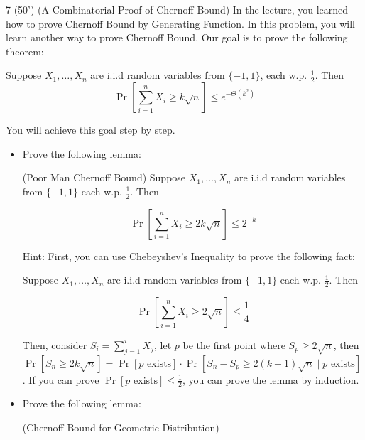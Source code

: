     
    \begin{question}{7 (50') (A Combinatorial Proof of Chernoff Bound)} 
    In the lecture, you learned how to prove Chernoff Bound by Generating Function.  In this problem, you will learn another way to prove Chernoff Bound. Our goal is to prove the following theorem: 

    \begin{theorem}\label{main}
    Suppose $X_1, \dots, X_n$ are i.i.d random variables from $\{-1, 1\}$, each w.p. $\frac 12$. Then $$\Pr[\sum_{i = 1} ^ n X_i \ge k \sqrt n] \le e ^ {- \Theta(k ^ 2)}$$
    \end{theorem}

    You will achieve this goal step by step. 

    
    
    \begin{itemize}
        \item[a. (10')] Prove the following lemma: 
        
        \begin{lemma} (Poor Man Chernoff Bound)
            Suppose $X_1, \dots, X_n$ are i.i.d random variables from $\{-1, 1\}$ each w.p. $\frac 12$. Then 
            
            $$\Pr[\sum_{i = 1} ^ n X_i \ge 2 k \sqrt {n}] \le 2 ^ {-k} $$
        \end{lemma}

        Hint:  First, you can use Chebeyshev’s Inequality to prove the following fact: 

        \begin{fact}
            Suppose $X_1, \dots, X_n$ are i.i.d random variables from $\{-1, 1\}$ each w.p. $\frac 12$. Then 

            $$\Pr[\sum_{i = 1} ^ n X_i \ge 2 \sqrt {n}] \le \frac 14 $$
        \end{fact}

        Then, consider $S_i = \sum_{j = 1} ^ i X_j$, let $p$ be the first point where $S_p \ge 2 \sqrt n$, 
        then $\Pr[S_n \ge 2 k \sqrt n] = \Pr[p 
 \text{ exists}] \cdot \Pr[S_n - S_p \ge 2 (k-1) \sqrt n \mid p \text{ exists}]$. If you can prove $\Pr[p \text{ exists} ] \le \frac 12$, you can prove the lemma by induction. 
        

        
        \item[b. (10')] Prove the following lemma: 

        \begin{lemma}(Chernoff Bound for Geometric Distribution) 
        

\end{lemma}
\end{itemize}
\end{question}
